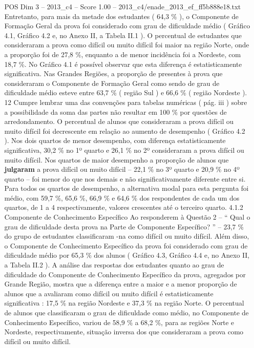 \begin{textsample}{POS Dim 3 – 2013\_c4 – Score 1.00 – 2013\_c4/enade\_2013\_ef\_ff5b888e18.txt}
Entretanto, para mais da metade dos estudantes ( 64,3 \% ), o Componente de Formação Geral da prova foi considerado com grau de dificuldade médio ( Gráfico 4.1, Gráfico 4.2 e, no Anexo II, a Tabela II.1 ).
O percentual de estudantes que consideraram a prova como difícil ou muito difícil foi maior na região Norte, onde a proporção foi de 27,8 \%, enquanto a de menor incidência foi a Nordeste, com 18,7 \%.
No Gráfico 4.1 é possível observar que esta diferença é estatisticamente significativa.
Nas Grandes Regiões, a proporção de presentes à prova que consideraram o Componente de Formação Geral como sendo de grau de dificuldade médio esteve entre 63,7 \% ( região Sul ) e 66,6 \% ( região Nordeste ). 12 Cumpre lembrar uma das convenções para tabelas numéricas ( pág. iii ) sobre a possibilidade da soma das partes não resultar em 100 \% por questões de arredondamento.
O percentual de alunos que consideraram a prova difícil ou muito difícil foi decrescente em relação ao aumento de desempenho ( Gráfico 4.2 ).
Nos dois quartos de menor desempenho, com diferença estatisticamente significativa, 30,2 \% no 1º quarto e 26,1 \% no 2º consideraram a prova difícil ou muito difícil.
Nos quartos de maior desempenho a proporção de alunos que \textbf{julgaram} a prova difícil ou muito difícil – 22,1 \% no 3º quarto e 20,9 \% no 4º quarto – foi menor do que nos demais e não significativamente diferente entre si.
Para todos os quartos de desempenho, a alternativa modal para esta pergunta foi médio, com 59,7 \%, 65,6 \%, 66,9 \% e 64,6 \% dos respondentes de cada um dos quartos, de 1 a 4 respectivamente, valores crescentes até o terceiro quarto. 4.1.2 Componente de Conhecimento Específico Ao responderem à Questão 2 – “ Qual o grau de dificuldade desta prova na Parte de Componente Específico? ” – 23,7 \% do grupo de estudantes classificaram -na como difícil ou muito difícil.
Além disso, o Componente de Conhecimento Específico da prova foi considerado com grau de dificuldade médio por 65,3 \% dos alunos ( Gráfico 4.3, Gráfico 4.4 e, no Anexo II, a Tabela II.2 ).
A análise das respostas dos estudantes quanto ao grau de dificuldade do Componente de Conhecimento Específico da prova, agregados por Grande Região, mostra que a diferença entre a maior e a menor proporção de alunos que a avaliaram como difícil ou muito difícil é estatisticamente significativa : 17,5 \% na região Nordeste e 37,3 \% na região Norte.
O percentual de alunos que classificaram o grau de dificuldade como médio, no Componente de Conhecimento Específico, variou de 58,9 \% a 68,2 \%, para as regiões Norte e Nordeste, respectivamente, situação inversa dos que consideraram a prova como difícil ou muito difícil.

\end{textsample}
